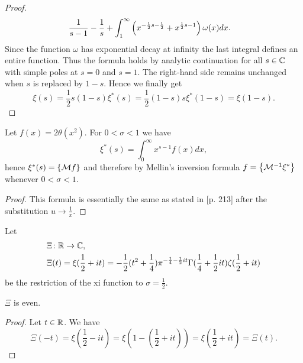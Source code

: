 \begin{proof}
\begin{equation*}
\begin{aligned}
		\frac{1}{s - 1} - \frac{1}{s} + \int _1 ^\infty \left(x^{-\frac{1}{2} s - \frac{1}{2}} + x^{\frac{1}{2} s - 1}\right) \omega(x) dx &.
\end{aligned}
\end{equation*}
	Since the function $\omega$ has exponential decay at infinity the last integral defines an entire function. Thus the formula holds by analytic continuation for all $s \in \mathbb{C}$ with simple poles at $s = 0$ and $s = 1$. The right-hand side remains unchanged when $s$ is replaced by $1 - s$. Hence we finally get
\begin{equation*}
	\xi(s) = \frac{1}{2}s(1 - s) \xi^*(s) = \frac{1}{2}(1 - s)s \xi^*(1 - s) = \xi(1 - s).
\end{equation*}
\end{proof}


\begin{lemma}\label{lem:XiMellin}
	Let $f(x) = 2 \theta(x^2)$. For $0 < \sigma < 1$ we have
\begin{equation*}
	\xi^*(s) = \int _0 ^\infty x^{s - 1} f(x) dx,
\end{equation*}
	hence $\xi^*(s) = \left\{\mathcal{M} f\right\}$ and therefore by Mellin's inversion formula $f = \left\{\mathcal{M}^{-1} \xi^*\right\}$ whenever $0 < \sigma < 1$.
\end{lemma}
\begin{proof}
	This formula is essentially the same as stated in \cite{Edwards1974} [p. 213] after the substitution $u \to \frac{1}{x}$.
\end{proof}


\begin{definition}
	Let
\begin{equation*}
\begin{aligned}
	&\Xi \colon \mathbb{R} \to \mathbb{C}, \\
	&\Xi(t) = \xi(\frac{1}{2} + it) = -\frac{1}{2}(t^2 + \frac{1}{4}) \pi ^{-\frac{1}{4} - \frac{1}{2} it} \Gamma(\frac{1}{4} + \frac{1}{2} it) \zeta(\frac{1}{2} + it)
\end{aligned}
\end{equation*}
	be the restriction of the xi function to $\sigma = \frac{1}{2}$.
\end{definition}


\begin{lemma}
	$\Xi$ is even.
\end{lemma}
\begin{proof}
	Let $t \in \mathbb{R}$. We have
\begin{equation*}
	\Xi(-t) = \xi(\frac{1}{2} - it) = \xi(1 - (\frac{1}{2} + it)) = \xi(\frac{1}{2} + it) = \Xi(t).
\end{equation*}
\end{proof}


